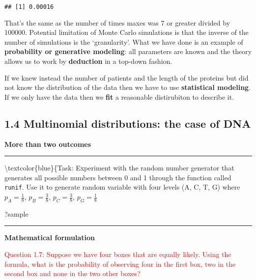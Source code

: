 \documentclass[]{article}
\newenvironment{Shaded}{\begin{snugshade}}{\end{snugshade}}
\newcommand{\NormalTok}[1]{#1}
\let\oldrule=\rule
\renewcommand{\rule}[1]{\oldrule{\linewidth}}
\begin{document}
\begin{verbatim}
## [1] 0.00016
\end{verbatim}

That's the same as the number of times maxes was 7 or greater divided by
100000. Potential limitation of Monte Carlo simulations is that the
inverse of the number of simulations is the `granularity'. What we have
done is an example of \textbf{probability or generative modeling}: all
parameters are known and the theory allows us to work by
\textbf{deduction} in a top-down fashion.

If we knew instead the number of patients and the length of the proteins
but did not know the distribution of the data then we have to use
\textbf{statistical modeling}. If we only have the data then we
\textbf{fit} a reasonable distirubiton to describe it.

\subsection{1.4 Multinomial distributions: the case of
DNA}\label{multinomial-distributions-the-case-of-dna}

\textbf{More than two outcomes}

\begin{center}\rule{0.5\linewidth}{\linethickness}\end{center}

\textbackslash{}textcolor\{blue\}\{Task: Experiment with the random
number generator that generates all possible numbers between 0 and 1
through the function called \texttt{runif}. Use it to generate random
variable with four levels (A, C, T, G) where \(p_A = \frac{1}{8}\),
\(p_B = \frac{3}{8}\), \(p_C = \frac{3}{8}\), \(p_G = \frac{1}{8}\)

\begin{Shaded}
\begin{Highlighting}[]
\NormalTok{?sample}
\end{Highlighting}
\end{Shaded}

\begin{center}\rule{0.5\linewidth}{\linethickness}\end{center}

\textbf{Mathematical formulation}

\textcolor{red}{Question 1.7: Suppose we have four boxes that are equally likely. Using the formula, what is the probability of observing four in the first box, two in the second box and none in the two other boxes?}
\end{document}
